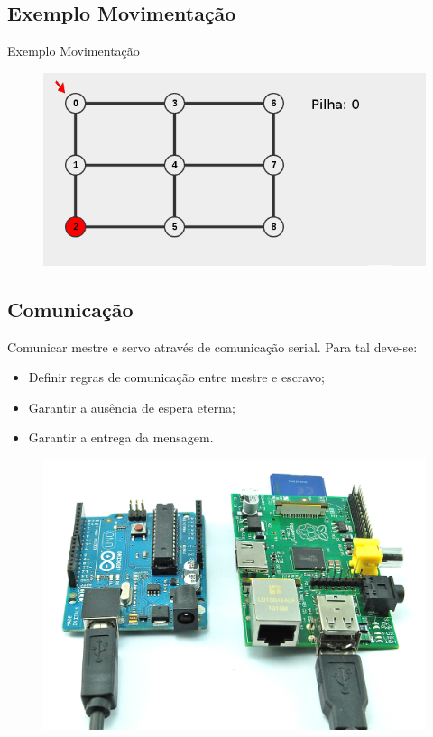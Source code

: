 \documentclass{beamer}
\begin{document}
\subsection{Exemplo Movimentação}
\begin{frame}
  Exemplo Movimentação
    \begin{figure}
    \centering
    \includegraphics[width=0.9\linewidth]{software_1}
  \end{figure}
\end{frame}

\subsection{Comunicação}
\begin{frame}
  \centering
  Comunicar mestre e servo através de comunicação serial. Para tal deve-se:
    \begin{itemize}
        \item Definir regras de comunicação entre mestre e escravo;
        \item Garantir a ausência de espera eterna;
        \item Garantir a entrega da mensagem.
    \end{itemize}
    \begin{figure}
    \centering
    \includegraphics[width=0.4\linewidth]{arduinopi}
  \end{figure}
\end{frame}
\end{document}
